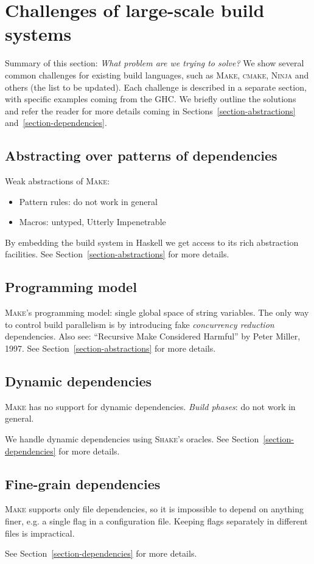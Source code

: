 \section{Challenges of large-scale build systems}

Summary of this section: \emph{What problem are we trying to solve?} We show several
common challenges for existing build languages, such as \textsc{Make},
\textsc{cmake}, \textsc{Ninja} and others (the list to be updated). Each
challenge is described in a separate section, with specific examples coming from
the GHC. We briefly outline the solutions and refer the reader for more details
coming in Sections~\ref{section-abstractions} and~\ref{section-dependencies}.

\subsection{Abstracting over patterns of dependencies}

Weak abstractions of \textsc{Make}:
\begin{itemize}
  \item Pattern rules: do not work in general
  \item Macros: untyped, Utterly Impenetrable 
\end{itemize}

By embedding the build system in Haskell we get access to its rich abstraction
facilities. See Section~\ref{section-abstractions} for more details.

\subsection{Programming model}

\textsc{Make}'s programming model: single global space of string variables. The
only way to control build parallelism is by introducing fake \emph{concurrency
reduction} dependencies. Also see: ``Recursive Make Considered Harmful'' by
Peter Miller, 1997. See Section~\ref{section-abstractions} for more details.

\subsection{Dynamic dependencies}

\textsc{Make} has no support for dynamic dependencies. \emph{Build phases}: do
not work in general. 

We handle dynamic dependencies using \textsc{Shake}'s oracles. See
Section~\ref{section-dependencies} for more details.

\subsection{Fine-grain dependencies}

\textsc{Make} supports only file dependencies, so it is impossible to depend
on anything finer, e.g. a single flag in a configuration file. Keeping flags
separately in different files is impractical. 

See Section~\ref{section-dependencies} for more details.
